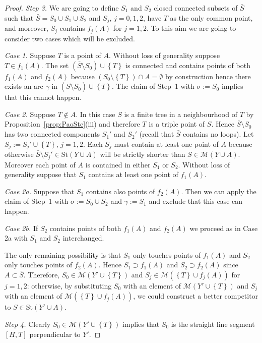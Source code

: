 \documentclass{amsart}
\newcommand{\ENCLOSE}[1]{\left\{#1\right\}}
\newcommand{\St}{\mathrm{St}}
\newcommand{\M}{\mathcal{M}}
\theoremstyle{definition}
\theoremstyle{remark}
\begin{document}
\begin{proof}
  \emph{Step 3.} 
  We are going to define $S_1$ and $S_2$ closed connected 
  subsets of $\bar S$ such that 
  $\bar S = S_0\cup S_1 \cup S_2$ 
  and $S_j$, $j=0,1,2$, have $T$ 
  as the only common point, and moreover,
  $S_j$ contains $f_j(A)$ for $j=1,2$.
  To this aim we are going to consider two cases 
  which will be excluded.

  \emph{Case 1.} 
  Suppose $T$ is a point of $A$.
  Without loss of generality suppose $T\in f_1(A)$.
  The set $(\bar S\setminus S_0)\cup\ENCLOSE{T}$
  is connected and contains points of both $f_1(A)$
  and $f_2(A)$ 
  because $(S_0\setminus\ENCLOSE{T})\cap A = \emptyset$ 
  by construction hence there exists an arc $\gamma$ 
  in $(\bar S\setminus S_0)\cup\ENCLOSE{T}$.
  The claim of Step~1 with $\sigma:=S_0$ implies that this cannot happen.
  
  \emph{Case 2.} Suppose $T\not \in A$.
  In this case $S$ is a finite tree in a neighbourhood of $T$
  by Proposition~\ref{prop:PaoSte}(iii) 
  and therefore $T$ is a triple point of $S$. 
  Hence $\bar S\setminus S_0$ has two connected components 
  $S_1'$ and $S_2'$ (recall that $\bar S$ contains no loops).
  Let $S_j:=S_j'\cup \ENCLOSE{T}$, $j=1,2$.
  Each $S_j$ must contain at least one point of $A$ because otherwise 
  $\bar S\setminus S_j'\in \St(Y\cup A)$ will be 
  strictly shorter than $S\in \M(Y\cup A)$.
  Moreover each point of $A$ is contained in either $S_1$ or $S_2$.
  Without loss of generality suppose that $S_1$ 
  contains at least one point of $f_1(A)$.
  
  \emph{Case 2a.} 
  Suppose that $S_1$ contains also points of $f_2(A)$.
  Then we can apply the claim of Step~1 with 
  $\sigma:= S_0 \cup S_2$ and 
  $\gamma:= S_1$ and exclude that this case can happen.
  
  \emph{Case 2b.} If $S_2$ contains points of both 
  $f_1(A)$ and $f_2(A)$ we proceed 
  as in Case 2a with $S_1$ and $S_2$ interchanged.
  
  The only remaining possibility is that $S_1$ 
  only touches points of $f_1(A)$ 
  and $S_2$ only touches points of $f_2(A)$. 
  Hence $S_1\supset f_1(A)$ and $S_2\supset f_2(A)$ since $A\subset \bar S$.
  Therefore, $S_0\in \M(Y'\cup \ENCLOSE{T})$  
  and $S_j \in \M(\ENCLOSE{T} \cup f_j(A))$ for $j=1,2$:
  otherwise, by substituting $S_0$ with an element of $\M(Y'\cup \ENCLOSE{T})$
  and $S_j$ with an element of $\M(\ENCLOSE{T}\cup f_j(A))$,
  we could construct a better competitor 
  to $S\in \St(Y'\cup A)$.
  
  \emph{Step 4.} 
  Clearly $S_0\in \M(Y'\cup \ENCLOSE{T})$ implies that $S_0$ is the straight 
  line segment $[H,T]$ perpendicular to $Y'$.
  

\end{proof}
\end{document}
